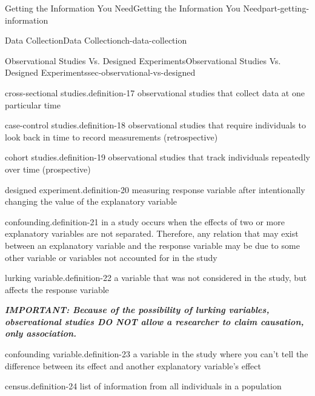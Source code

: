 \documentclass[oneside,10pt,]{book}
\newcommand{\alert}[1]{\textbf{\textit{#1}}}
\numberwithin{equation}{section}
\newlength{\qrsize}
\newlength{\previewwidth}
\begin{document}
\begin{partptx}{Getting the Information You Need}{}{Getting the Information You Need}{}{}{part-getting-information}
\begin{chapterptx}{Data Collection}{}{Data Collection}{}{}{ch-data-collection}
\begin{sectionptx}{Observational Studies Vs. Designed Experiments}{}{Observational Studies Vs. Designed Experiments}{}{}{sec-observational-vs-designed}
\begin{definition}{cross-sectional studies.}{definition-17}
observational studies that collect data at one particular time\end{definition}
\begin{definition}{case-control studies.}{definition-18}%
observational studies that require individuals to look back in time to record measurements (retrospective)\end{definition}
\begin{definition}{cohort studies.}{definition-19}%
observational studies that track individuals repeatedly over time (prospective)\end{definition}
\begin{definition}{designed experiment.}{definition-20}%
measuring response variable after intentionally changing the value of the explanatory variable\end{definition}
\begin{definition}{confounding.}{definition-21}%
in a study occurs when the effects of two or more explanatory variables are not separated. Therefore, any relation that may exist between an explanatory variable and the response variable may be due to some other variable or variables not accounted for in the study\end{definition}
\begin{definition}{lurking variable.}{definition-22}%
a variable that was not considered in the study, but affects the response variable\end{definition}
\hypertarget{p-6}{}%
\alert{IMPORTANT: Because of the possibility of lurking variables, observational studies \emph{DO NOT} allow a researcher to claim causation, only \emph{association}.}%
\begin{definition}{confounding variable.}{definition-23}%
a variable in the study where you can’t tell the difference between its effect and another explanatory variable’s effect\end{definition}
\begin{definition}{census.}{definition-24}%
list of information from all individuals in a population\end{definition}
\begin{figure}
\centering
\setlength{\qrsize}{9em}
\setlength{\previewwidth}{\linewidth}
\addtolength{\previewwidth}{-\qrsize}
\begin{tcbraster}[raster columns=2, raster column skip=1pt, raster halign=center, raster force size=false, raster left skip=0pt, raster right skip=0pt]%
\begin{tcolorbox}[previewstyle, width=\previewwidth]%

\end{tcolorbox}
\end{tcbraster}
\end{figure}
\end{sectionptx}
\end{chapterptx}
\end{partptx}
\end{document}
